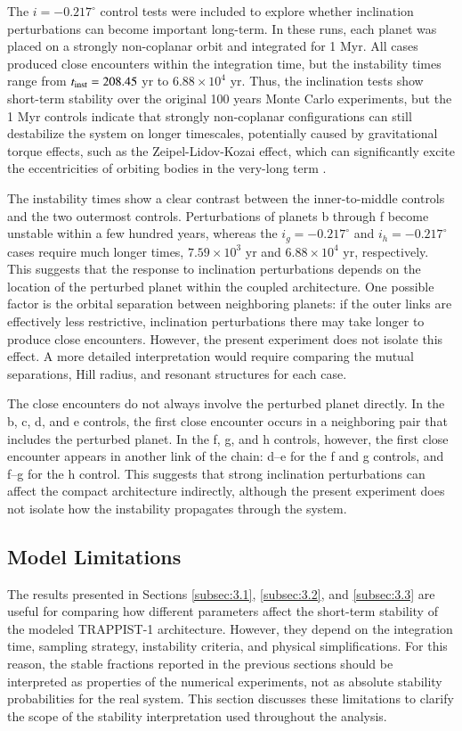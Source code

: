 \documentclass{aa}
\begin{document}
The $i=-0.217^\circ$ control tests were included to explore whether inclination perturbations can become important long-term. In these runs, each planet was placed on a strongly non-coplanar orbit and integrated for 1 Myr. All cases produced close encounters within the integration time, but the instability times range from $t_{\rm inst}=208.45$ yr to $6.88\times10^4$ yr. Thus, the inclination tests show short-term stability over the original 100 years Monte Carlo experiments, but the 1 Myr controls indicate that strongly non-coplanar configurations can still destabilize the system on longer timescales, potentially caused by gravitational torque effects, such as the Zeipel-Lidov-Kozai effect, which can significantly excite the eccentricities of orbiting bodies in the very-long term \citep{2022A&A...665A..62L}.

The instability times show a clear contrast between the inner-to-middle controls and the two outermost controls. Perturbations of planets b through f become unstable within a few hundred years, whereas the $i_g=-0.217^\circ$ and $i_h=-0.217^\circ$ cases require much longer times, $7.59\times10^3$ yr and $6.88\times10^4$ yr, respectively. This suggests that the response to inclination perturbations depends on the location of the perturbed planet within the coupled architecture. One possible factor is the orbital separation between neighboring planets: if the outer links are effectively less restrictive, inclination perturbations there may take longer to produce close encounters. However, the present experiment does not isolate this effect. A more detailed interpretation would require comparing the mutual separations, Hill radius, and resonant structures for each case.

The close encounters do not always involve the perturbed planet directly. In the b, c, d, and e controls, the first close encounter occurs in a neighboring pair that includes the perturbed planet. In the f, g, and h controls, however, the first close encounter appears in another link of the chain: d--e for the f and g controls, and f--g for the h control. This suggests that strong inclination perturbations can affect the compact architecture indirectly, although the present experiment does not isolate how the instability propagates through the system.

\subsection{Model Limitations}
The results presented in Sections \ref{subsec:3.1}, \ref{subsec:3.2}, and \ref{subsec:3.3} are useful for comparing how different parameters affect the short-term stability of the modeled TRAPPIST-1 architecture. However, they depend on the integration time, sampling strategy, instability criteria, and physical simplifications. For this reason, the stable fractions reported in the previous sections should be interpreted as properties of the numerical experiments, not as absolute stability probabilities for the real system. This section discusses these limitations to clarify the scope of the stability interpretation used throughout the analysis.
\end{document}
